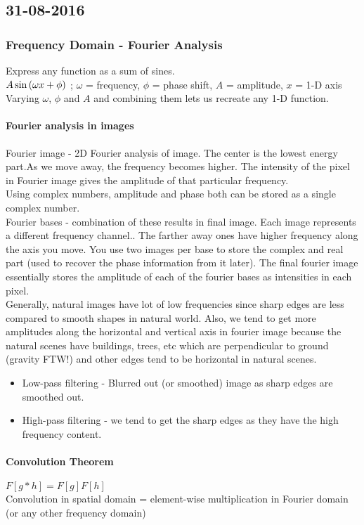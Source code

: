 \subsection{31-08-2016}
\subsubsection{Frequency Domain - Fourier Analysis}
 Express any function as a sum of sines.\\
 $A \sin{(\omega x+ \phi)}$ ; $\omega$ = frequency, $\phi$ = phase shift, $A$ = amplitude, $x$ = 1-D axis\\
 Varying $\omega$, $\phi$ and $A$ and combining them lets us recreate any 1-D function.
\paragraph{Fourier analysis in images}
Fourier image - 2D Fourier analysis of image. The center is the lowest energy part.As we move away, the frequency becomes higher. The intensity of the pixel in Fourier image gives the amplitude of that particular frequency.\\
Using complex numbers, amplitude and phase both can be stored as a single complex number.\\
Fourier bases - combination of these results in final image. Each image represents a different frequency channel.. The farther away ones have higher frequency along the axis you move. You use two images per base to store the complex and real part (used to recover the phase information from it later). The final fourier image essentially stores the amplitude of each of the fourier bases as intensities in each pixel.\\
Generally, natural images have lot of low frequencies since sharp edges are less compared to smooth shapes in natural world. Also, we tend to get more amplitudes along the horizontal and vertical axis in fourier image because the natural scenes have buildings, trees, etc which are perpendicular to ground (gravity FTW!) and other edges tend to be horizontal in natural scenes.
\begin{itemize}
\item Low-pass filtering - Blurred out (or smoothed) image as sharp edges are smoothed out.
\item High-pass filtering - we tend to get the sharp edges as they have the high frequency content.
\end{itemize}
\paragraph{Convolution Theorem}
$F[g*h] = F[g]F[h]$\\
Convolution in spatial domain = element-wise multiplication in Fourier domain (or any other frequency domain)